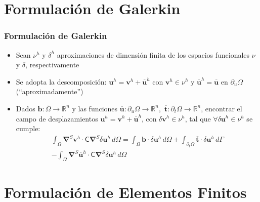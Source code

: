 \documentclass[10pt, aspectratio=43]{beamer}
\begin{document}
\section[Galerkin]{Formulación de Galerkin}

\begin{frame}
\frametitle{Formulación de Galerkin}
\begin{itemize}
\item Sean $\nu^h$ y $\delta^h$ aproximaciones de dimensión finita de los
espacios funcionales $\nu$ y $\delta$, respectivamente
\item Se adopta la descomposición: $\bm{u}^h=\bm{v}^h+\overline{\bm{u}}^h$
con $\bm{v}^h \in \nu^h$ y 
$\overline{\bm{u}}^h=\overline{\bm{u}}$ en $\partial_u \Omega$ (``aproximadamente'')
\item Dados $\bm{b}:\overline{\Omega}\rightarrow \mathbb{R}^n$ y las funciones
$\overline{\bm{u}}:\partial_u \Omega  \rightarrow \mathbb{R}^n$,\, 
$\overline{\bm{t}}:\partial_t \Omega  \rightarrow \mathbb{R}^n$, 
encontrar el campo de
desplazamientos $\bm{u}^h=\bm{v}^h+\overline{\bm{u}}^h$, con $\delta \bm{v}^h
\in \nu^h$, tal que
$\forall \delta \bm{u}^h \in \nu^h$ se cumple:
\begin{equation}
\begin{split}
\int_{\Omega}
\bm{\nabla}^{S} \bm{v}^h \cdot \bm{\mathsf{C}}
\bm{\nabla}^{S}\delta \bm{u}^h \, d \Omega
=\int_{\Omega} \bm{b} \cdot \delta \bm{u}^h \, d \Omega
+\int_{\partial_t \Omega} \overline{\bm{t}}\cdot
\delta \bm{u}^h \, d \Gamma \\
-\int_{\Omega} \bm{\nabla}^{S} \overline{\bm{u}}^h \cdot \bm{\mathsf{C}}
\bm{\nabla}^{S}\delta \bm{u}^h \, d \Omega
\end{split}
\label{ecvapr1}
\end{equation}
\end{itemize}
\end{frame}

\section[EF]{Formulación de Elementos Finitos}
\end{document}
